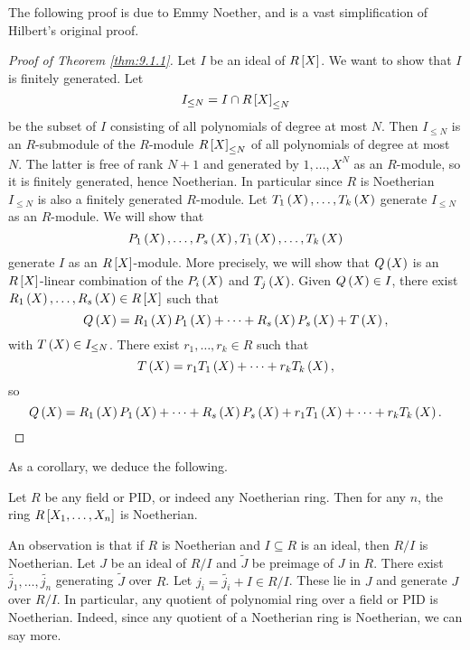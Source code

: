 The following proof is due to Emmy Noether, and is a vast simplification of Hilbert's original proof.

\begin{proof}[Proof of Theorem \ref{thm:9.1.1}]
Let $ I $ be an ideal of $ R\sb{X} $. We want to show that $ I $ is finitely generated. Let
$$ I_{\le N} = I \cap R\sb{X}_{\le N} $$
be the subset of $ I $ consisting of all polynomials of degree at most $ N $. Then $ I_{\le N} $ is an $ R $-submodule of the $ R $-module $ R\sb{X}_{\le N} $ of all polynomials of degree at most $ N $. The latter is free of rank $ N + 1 $ and generated by $ 1, \dots, X^N $ as an $ R $-module, so it is finitely generated, hence Noetherian. In particular since $ R $ is Noetherian $ I_{\le N} $ is also a finitely generated $ R $-module. Let $ T_1\rb{X}, \dots, T_k\rb{X} $ generate $ I_{\le N} $ as an $ R $-module. We will show that
$$ P_1\rb{X}, \dots, P_s\rb{X}, T_1\rb{X}, \dots, T_k\rb{X} $$
generate $ I $ as an $ R\sb{X} $-module. More precisely, we will show that $ Q\rb{X} $ is an $ R\sb{X} $-linear combination of the $ P_i\rb{X} $ and $ T_j\rb{X} $. Given $ Q\rb{X} \in I $, there exist $ R_1\rb{X}, \dots, R_s\rb{X} \in R\sb{X} $ such that
$$ Q\rb{X} = R_1\rb{X}P_1\rb{X} + \dots + R_s\rb{X}P_s\rb{X} + T\rb{X}, $$
with $ T\rb{X} \in I_{\le N} $. There exist $ r_1, \dots, r_k \in R $ such that
$$ T\rb{X} = r_1T_1\rb{X} + \dots + r_kT_k\rb{X}, $$
so
$$ Q\rb{X} = R_1\rb{X}P_1\rb{X} + \dots + R_s\rb{X}P_s\rb{X} + r_1T_1\rb{X} + \dots + r_kT_k\rb{X}. $$
\end{proof}

\pagebreak

As a corollary, we deduce the following.

\begin{corollary}
Let $ R $ be any field or PID, or indeed any Noetherian ring. Then for any $ n $, the ring $ R\sb{X_1, \dots, X_n} $ is Noetherian.
\end{corollary}

An observation is that if $ R $ is Noetherian and $ I \subseteq R $ is an ideal, then $ R / I $ is Noetherian. Let $ J $ be an ideal of $ R / I $ and $ \widetilde{J} $ be preimage of $ J $ in $ R $. There exist $ \widetilde{j_1}, \dots, \widetilde{j_n} $ generating $ \widetilde{J} $ over $ R $. Let $ j_i = \widetilde{j_i} + I \in R / I $. These lie in $ J $ and generate $ J $ over $ R / I $. In particular, any quotient of polynomial ring over a field or PID is Noetherian. Indeed, since any quotient of a Noetherian ring is Noetherian, we can say more.


